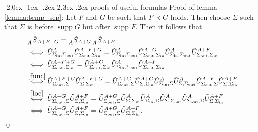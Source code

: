 \documentclass[oneside,reqno,12pt]{amsart}
\makeatletter
\DeclareMathOperator{\supp}{supp}
\renewcommand\section{\@startsection {section}{1}{\z@}%
                                   {-2.0ex \@plus -1ex \@minus -.2ex}%
                                   {2.3ex \@plus.2ex}%
                                   {\normalfont\Large\bfseries}}
\makeatother
\begin{document}
\section{proofs of useful formulas}
Proof of lemma \ref{lemma:temp_sep}: Let \(F\) and \(G\) be such that \(F\prec G\) holds. Then choose \(\Sigma\) such that \(\Sigma\) is before \(\supp G\) but after \(\supp F\). Then it follows that
\begin{align*}
&\prescript{}{A}{\tilde{S}}_{A+F+G}=\prescript{}{A}{\tilde{S}}_{A+G}\prescript{}{A}{\tilde{S}}_{A+F}\\
&\iff  \tilde{U}^A_{\Sigma_{\text{in}},\Sigma_{\text{out}}} \tilde{U}^{A+F+G}_{\Sigma_{\text{out}},\Sigma_{\text{in}}}
= \tilde{U}^A_{\Sigma_{\text{in}},\Sigma_{\text{out}}} \tilde{U}^{A+G}_{\Sigma_{\text{out}},\Sigma_{\text{in}}}
 \tilde{U}^A_{\Sigma_{\text{in}},\Sigma_{\text{out}}} \tilde{U}^{A+F}_{\Sigma_{\text{out}},\Sigma_{\text{in}}}\\
 &\iff  \tilde{U}^{A+F+G}_{\Sigma_{\text{out}},\Sigma_{\text{in}}}
=  \tilde{U}^{A+G}_{\Sigma_{\text{out}},\Sigma_{\text{in}}}
 \tilde{U}^A_{\Sigma_{\text{in}},\Sigma_{\text{out}}} 
 \tilde{U}^{A+F}_{\Sigma_{\text{out}},\Sigma_{\text{in}}}\\
 &\stackrel{\eqref{func}}{\iff}
 \tilde{U}^{A+F+G}_{\Sigma_{\text{out}},\Sigma}
 \tilde{U}^{A+F+G}_{\Sigma,\Sigma_{\text{in}}}=
 \tilde{U}^{A+G}_{\Sigma_{\text{out}},\Sigma} \tilde{U}^{A+G}_{\Sigma,\Sigma_{\text{in}}}
 \tilde{U}^A_{\Sigma_{\text{in}},\Sigma} \tilde{U}^A_{\Sigma ,\Sigma_{\text{out}}} 
 \tilde{U}^{A+F}_{\Sigma_{\text{out}},\Sigma} \tilde{U}^{A+F}_{\Sigma,\Sigma_{\text{in}}}\\
 &\stackrel{\eqref{loc}}{\iff}
 \tilde{U}^{A+G}_{\Sigma_{\text{out}},\Sigma}
 \tilde{U}^{A+F}_{\Sigma,\Sigma_{\text{in}}}= 
 \tilde{U}^{A+G}_{\Sigma_{\text{out}},\Sigma} \tilde{U}^{A}_{\Sigma,\Sigma_{\text{in}}} 
  \tilde{U}^A_{\Sigma_{\text{in}},\Sigma} \tilde{U}^A_{\Sigma ,\Sigma_{\text{out}}} 
   \tilde{U}^{A}_{\Sigma_{\text{out}},\Sigma} \tilde{U}^{A+F}_{\Sigma,\Sigma_{\text{in}}}\\
 &\iff 
 \tilde{U}^{A+G}_{\Sigma_{\text{out}},\Sigma}
 \tilde{U}^{A+F}_{\Sigma,\Sigma_{\text{in}}}= 
 \tilde{U}^{A+G}_{\Sigma_{\text{out}},\Sigma}\tilde{U}^{A+F}_{\Sigma,\Sigma_{\text{in}}}.
\end{align*}
\qed
\end{document}
